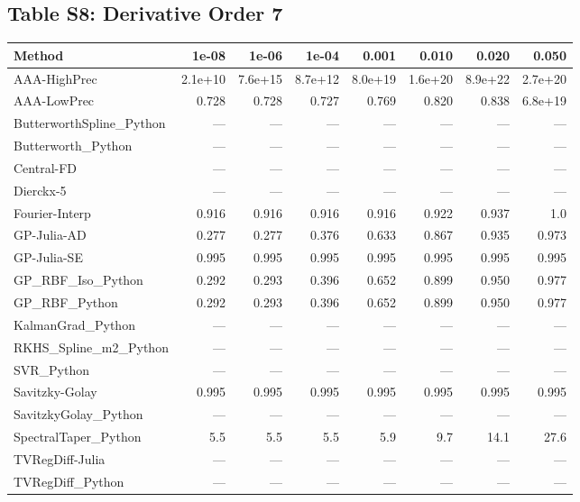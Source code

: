 \documentclass[10pt]{article}
\begin{document}
\clearpage

\subsection*{Table S8: Derivative Order 7}

\begin{longtable}{lrrrrrrr}
\toprule
\textbf{Method} & \textbf{1e-08} & \textbf{1e-06} & \textbf{1e-04} & \textbf{0.001} & \textbf{0.010} & \textbf{0.020} & \textbf{0.050} \\
\midrule
\endhead
AAA-HighPrec & 2.1e+10 & 7.6e+15 & 8.7e+12 & 8.0e+19 & 1.6e+20 & 8.9e+22 & 2.7e+20 \\
AAA-LowPrec & 0.728 & 0.728 & 0.727 & 0.769 & 0.820 & 0.838 & 6.8e+19 \\
ButterworthSpline\_Python & --- & --- & --- & --- & --- & --- & --- \\
Butterworth\_Python & --- & --- & --- & --- & --- & --- & --- \\
Central-FD & --- & --- & --- & --- & --- & --- & --- \\
Dierckx-5 & --- & --- & --- & --- & --- & --- & --- \\
Fourier-Interp & 0.916 & 0.916 & 0.916 & 0.916 & 0.922 & 0.937 & 1.0 \\
GP-Julia-AD & 0.277 & 0.277 & 0.376 & 0.633 & 0.867 & 0.935 & 0.973 \\
GP-Julia-SE & 0.995 & 0.995 & 0.995 & 0.995 & 0.995 & 0.995 & 0.995 \\
GP\_RBF\_Iso\_Python & 0.292 & 0.293 & 0.396 & 0.652 & 0.899 & 0.950 & 0.977 \\
GP\_RBF\_Python & 0.292 & 0.293 & 0.396 & 0.652 & 0.899 & 0.950 & 0.977 \\
KalmanGrad\_Python & --- & --- & --- & --- & --- & --- & --- \\
RKHS\_Spline\_m2\_Python & --- & --- & --- & --- & --- & --- & --- \\
SVR\_Python & --- & --- & --- & --- & --- & --- & --- \\
Savitzky-Golay & 0.995 & 0.995 & 0.995 & 0.995 & 0.995 & 0.995 & 0.995 \\
SavitzkyGolay\_Python & --- & --- & --- & --- & --- & --- & --- \\
SpectralTaper\_Python & 5.5 & 5.5 & 5.5 & 5.9 & 9.7 & 14.1 & 27.6 \\
TVRegDiff-Julia & --- & --- & --- & --- & --- & --- & --- \\
TVRegDiff\_Python & --- & --- & --- & --- & --- & --- & --- \\

\end{longtable}
\end{document}
